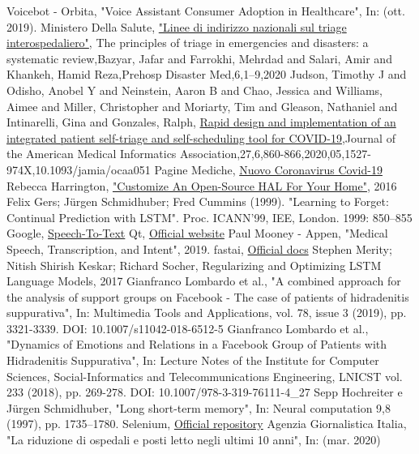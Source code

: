 \documentclass[conference]{IEEEtran}
\begin{document}
\begin{thebibliography}{00}
     Voicebot - Orbita, "Voice Assistant Consumer Adoption in Healthcare", In: (ott. 2019).
     Ministero Della Salute, \href{http://www.salute.gov.it/imgs/C_17_notizie_3849_listaFile_itemName_1_file.pdf}{"Linee di indirizzo nazionali sul triage interospedaliero"},
     The principles of triage in emergencies and disasters: a systematic review,Bazyar, Jafar and Farrokhi, Mehrdad and Salari, Amir and Khankeh, Hamid Reza,Prehosp Disaster Med,6,1--9,2020
     Judson, Timothy J and Odisho, Anobel Y and Neinstein, Aaron B and Chao, Jessica and Williams, Aimee and Miller, Christopher and Moriarty, Tim and Gleason, Nathaniel and Intinarelli, Gina and Gonzales, Ralph, \href{https://doi.org/10.1093/jamia/ocaa051}{Rapid design and implementation of an integrated patient self-triage and self-scheduling tool for COVID-19},Journal of the American Medical Informatics Association,27,6,860-866,2020,05,1527-974X,10.1093/jamia/ocaa051
     Pagine Mediche, \href{https://www.paginemediche.it/coronavirus}{Nuovo Coronavirus Covid-19}
     Rebecca Harrington, \href{https://www.popsci.com/ultimate-diy-ai/}{"Customize An Open-Source HAL For Your Home"}, 2016
     Felix Gers; Jürgen Schmidhuber; Fred Cummins (1999). "Learning to Forget: Continual Prediction with LSTM". Proc. ICANN'99, IEE, London. 1999: 850–855
     Google, \href{https://cloud.google.com/speech-to-text}{Speech-To-Text}
     Qt, \href{https://www.qt.io/}{Official website}
     Paul Mooney - Appen, "Medical Speech, Transcription, and Intent", 2019.
     fastai, \href{https://docs.fast.ai/}{Official docs}
     Stephen Merity; Nitish Shirish Keskar; Richard Socher, Regularizing and Optimizing LSTM Language Models, 2017
     Gianfranco Lombardo et al., "A combined approach for the analysis of support groups on Facebook - The case of patients of hidradenitis suppurativa", In: Multimedia Tools and Applications, vol. 78, issue 3 (2019), pp. 3321-3339. DOI: 10.1007/s11042-018-6512-5 
     Gianfranco Lombardo et al., "Dynamics of Emotions and Relations in a Facebook Group of Patients with Hidradenitis Suppurativa", In: Lecture Notes of the Institute for Computer Sciences, Social-Informatics and Telecommunications Engineering, LNICST vol. 233 (2018), pp. 269-278. DOI: 10.1007/978-3-319-76111-4\_27 
     Sepp Hochreiter e Jürgen Schmidhuber, "Long short-term memory", In: Neural computation 9,8 (1997), pp. 1735–1780.
     Selenium, \href{https://github.com/SeleniumHQ/selenium}{Official repository}
     Agenzia Giornalistica Italia, "La riduzione di ospedali e posti letto negli ultimi 10 anni", In: (mar. 2020)
\end{thebibliography}
\end{document}
